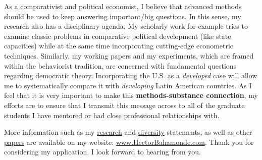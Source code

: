 \documentclass[10pt,stdletter,dateno,sigleft]{newlfm} %
\begin{document}
\begin{newlfm}
As a comparativist and political economist, I believe that advanced methods should be used to keep answering important/big questions. In this sense, my research also has a disciplinary agenda. My scholarly work for example tries to examine classic problems in comparative political development (like state capacities) while at the same time incorporating cutting-edge econometric techniques. Similarly, my working papers and my experiments, which are framed within the behaviorist tradition, are concerned with fundamental questions regarding democratic theory. Incorporating the U.S. as a \emph{developed} case will allow me to systematically compare it with \emph{developing} Latin American countries. As I feel that it is very important to make this {\bf methods-substance connection}, my efforts are to ensure that I transmit this message across to all of the graduate students I have mentored or had close professional relationships with. 


More information such as my \href{http://github.com/hbahamonde/Job_Market/raw/master/Bahamonde_Research_Statement.pdf}{research} and \href{http://github.com/hbahamonde/Job_Market/raw/master/Bahamonde_Diversity_Statement.pdf}{diversity} statements, as well as other \href{http://www.hectorbahamonde.com/research/}{papers} are available on my website: \href{http://www.hectorbahamonde.com}{www.HectorBahamonde.com}. Thank you for considering my application. I look forward to hearing from you.






\end{newlfm}
\end{document}

